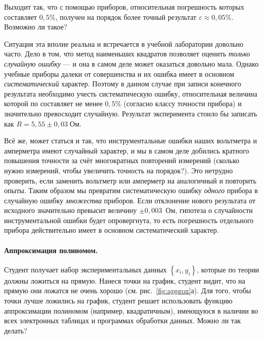 Выходит так, что с помощью приборов, относительная погрешность которых
составляет $0{,}5\%$, получен на порядок более точный результат
$\varepsilon\approx0{,}05\%$.
Возможно ли такое?

\begin{longnote}
Ситуация эта вполне реальна и встречается в учебной лаборатории довольно часто.
Дело в
том, что метод наименьших квадратов позволяет оценить \emph{только
случайную ошибку} --- и она в самом деле может оказаться довольно мала. Однако
учебные приборы далеки от совершенства и их ошибка имеет в основном
\emph{систематический} характер. Поэтому в данном случае при записи конечного
результата
необходимо учесть систематическую ошибку, относительная величина которой по
составляет
не менее $0{,}5$\% (согласно классу точности прибора) и значительно превосходит
случайную. Результат эксперимента стоило бы записать как
$R=5{,}55\pm0{,}03\;\text{Ом}$.

Всё же, может статься и так, что инструментальные
ошибки наших вольтметра и амперметра имеют случайный характер, и мы
в самом деле добились кратного повышения точности за счёт многократных
повторений измерений (сколько нужно измерений, чтобы увеличить точность
на порядок?). Это нетрудно проверить, если заменить вольтметр или
амперметр на аналогичный и повторить опыты. Таким образом мы превратим
систематическую ошибку \emph{одного} прибора в случайную ошибку
\emph{множества}
приборов. Если отклонение нового результата от исходного значительно
превысит величину $\pm0{,}003$~Ом, гипотеза о случайности инструментальной
ошибки будет опровергнута, то есть погрешность отдельного прибора
действительно имеет в основном систематический характер.\par
\end{longnote}

\paragraph{Аппроксимация полиномом.}
Студент получает набор экспериментальных данных $\left\{ x_{i},y_{i}\right\} $,
которые по теории должны ложиться на прямую. Нанеся точки на график,
студент видит, что на прямую они ложатся не очень хорошо (см.
рис.~\ref{fig:approx}а).
Для того, чтобы точки лучше ложились на график, студент решает использовать
функцию аппроксимации полиномом (например, квадратичным), имеющуюся
в наличии во всех электронных таблицах и программах обработки данных.
Можно ли так делать?


